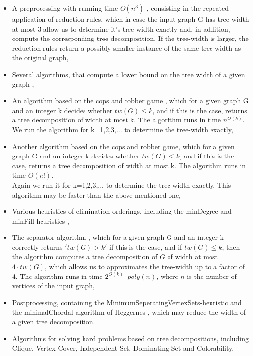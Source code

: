 \documentclass[a4wide]{article}
\begin{document}
\begin{itemize}
\item A preprocessing with running time $O(n^3)$ \cite{B_tc3, A_P_rec}, consisting in
the repeated application of reduction rules, which in case the
input graph G has tree-width at most 3 allow us to determine it's tree-width exactly and, in addition, compute the corresponding tree decomposition. If the tree-width is larger, the reduction rules return a possibly smaller instance of the same tree-width as the original graph,

\item Several algorithms, that compute a lower bound on the tree width of a given graph \cite{B_lb_db, CC_lb_nw, B_tc2, L_lb_mcs},

\item An algorithm based on the cops and robber game \cite{ST_minmax}, which
for a given graph G and an integer k decides whether $tw(G)\leq k$,
and if this is the case, returns a tree decomposition of width at most
k. The algorithm runs in time $n^{O(k)}$. \\
We run the algorithm for k=1,2,3,... to determine the tree-width exactly,

\item Another algorithm based on the cops and robber game, which for a given graph G and an integer k decides whether $tw(G)\leq k$,
and if this is the case, returns a tree decomposition of width at most
k. The algorithm runs in time $O(n!)$. \\
Again we run it for k=1,2,3,... to determine the tree-width exactly. This algorithm may be faster than the above mentioned one,

\item Various heuristics of elimination orderings, including the minDegree and minFill-heuristics \cite{B_tc1},  

\item The separator algorithm \cite{R_sep}, which for a given graph G and
an integer k correctly returns $'tw(G)>k'$ if this is the case, and
if $tw(G) \leq k$, then the algorithm computes a tree decomposition
of $G$ of width at most $4 \cdot tw(G)$, which allows us to approximates the tree-width up to a factor of 4. The algorithm runs in time $2^{O(k)} \cdot poly(n)$, where $n$ is the number of vertices of the input graph,

\item Postprocessing, containing the MinimumSeperatingVertexSets-heuristic \cite{B_tc3, Koster_thesis} and the minimalChordal algorithm of Heggernes \cite{BHS_md}, which may reduce the width of a given tree decomposition.

\item Algorithms for solving hard problems based on tree decompositions, including Clique, Vertex Cover, Independent Set, Dominating Set and Colorability.

\end{itemize}
\end{document}
